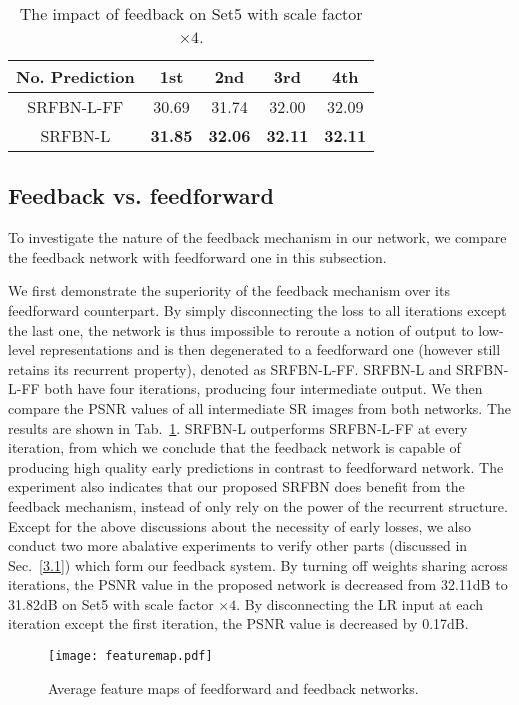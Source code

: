 \documentclass[10pt,twocolumn,letterpaper]{article}
\begin{document}
	\begin{table}[!htbp]
		\centering
		\begin{tabular}{|c|c|c|c|c|}
			\hline
			No. Prediction & 1st & 2nd    & 3rd    & 4th    \\ \hline\hline
			SRFBN-L-FF &  30.69  & 31.74 & 32.00 & 32.09 \\ \hline
			SRFBN-L    &  \textbf{31.85}  & \textbf{32.06} & \textbf{32.11} & \textbf{32.11} \\ \hline
		\end{tabular}\smallskip
		\caption{The impact of feedback on Set5 with scale factor $\times4$.\label{ff_vs_fb}}
		\vspace{-0.45cm}			
	\end{table}
	
	\subsection{Feedback vs. feedforward}
	To investigate the nature of the feedback mechanism in our network, we compare the feedback network with feedforward one in this subsection.
	
	We first demonstrate the superiority of the feedback mechanism over its feedforward counterpart. By simply disconnecting the loss to all iterations except the last one, the network is thus impossible to reroute a notion of output to low-level representations and is then degenerated to a feedforward one (however still retains its recurrent property), denoted as SRFBN-L-FF. SRFBN-L and SRFBN-L-FF both have four iterations, producing four intermediate output. We then compare the PSNR values of all intermediate SR images from both networks. The results are shown in Tab.~\ref{ff_vs_fb}. SRFBN-L outperforms SRFBN-L-FF at every iteration, from which we conclude that the feedback network is capable of producing high quality early predictions in contrast to feedforward network. The experiment also indicates that our proposed SRFBN does benefit from the feedback mechanism, instead of only rely on the power of the recurrent structure. Except for the above discussions about the necessity of early losses, we also conduct two more abalative experiments to verify other parts (discussed in Sec.~\ref{3.1}) which form our feedback system. By turning off weights sharing across iterations, the PSNR value in the proposed network is decreased from 32.11dB to 31.82dB on Set5 with scale factor $\times 4$. By disconnecting the LR input at each iteration except the first iteration, the PSNR value is decreased by 0.17dB. 
	\vspace{-0.4cm}
	\begin{figure}[!htbp]
		\centering
		\texttt{[image: featuremap.pdf]}
		\caption{Average feature maps of feedforward and feedback networks.}
		\label{featuremap}
\end{figure}
\end{document}
